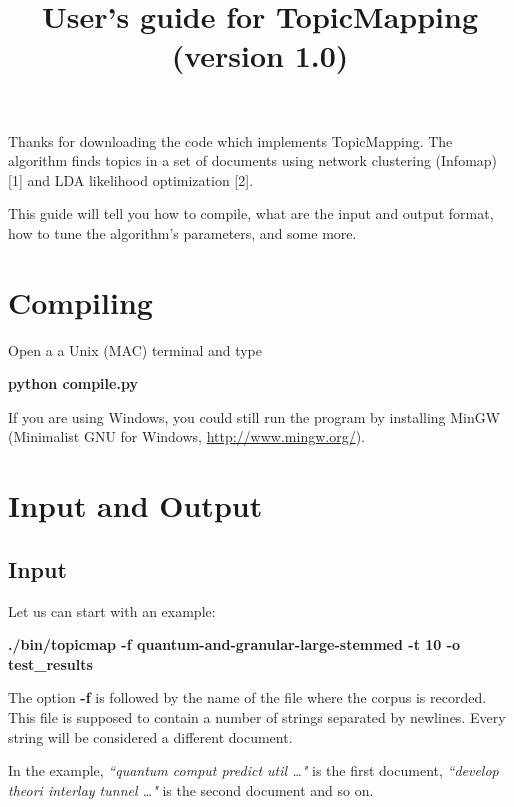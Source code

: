 \documentclass[11pt]{article}
\title{User's guide for TopicMapping (version 1.0)}
\begin{document}
\maketitle



Thanks for downloading the code which implements TopicMapping.
The algorithm finds topics in a set of documents using network clustering (Infomap) [1] 
and  LDA likelihood optimization [2]. 


This guide will tell you how to compile, what are the input and output format,
how to tune the algorithm's parameters, and some more.



\tableofcontents

\newpage

\section{Compiling}


Open  a a Unix (MAC) terminal and type  

\textbf{python compile.py}

If you are using Windows, you could still run
the program by installing MinGW
(Minimalist GNU for Windows, \url{http://www.mingw.org/}).


\section{Input and Output}

\subsection{Input}
Let us can start with an example:

\textbf{./bin/topicmap -f quantum-and-granular-large-stemmed -t 10 -o test\_results}

The option \textbf{-f} is followed by the name of the file where the corpus is recorded. This file is supposed 
to contain a number of strings separated by newlines. Every string will be considered a different document.

In the example, 
\textit{``quantum comput predict util  \dots"}
is the first document, 
\textit{``develop theori interlay tunnel \dots"}
is the second document and so on.
\end{document}
